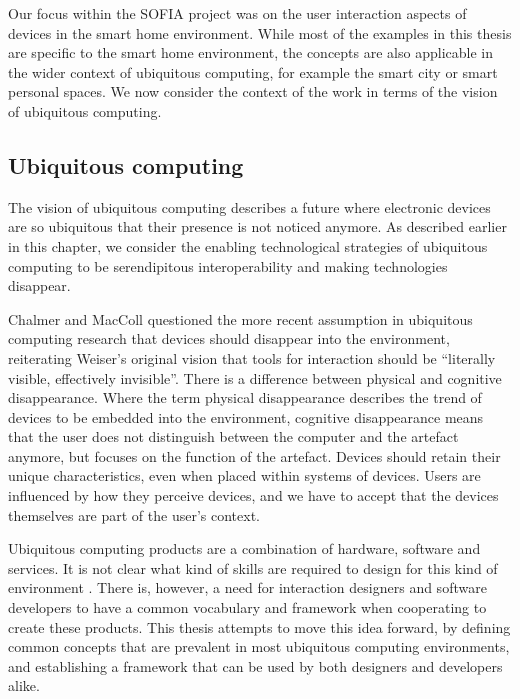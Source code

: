 Our focus within the \ac{SOFIA} project was on the user interaction aspects of devices in the smart home environment. While most of the examples in this thesis are specific to the smart home environment, the concepts are also applicable in the wider context of ubiquitous computing, for example the smart city or smart personal spaces. %
We now consider the context of the work in terms of the vision of ubiquitous computing.

\subsection{Ubiquitous computing}

The vision of ubiquitous computing describes a future where electronic devices are so ubiquitous that their presence is not noticed anymore. As described earlier in this chapter, we consider the enabling technological strategies of ubiquitous computing to be serendipitous interoperability and making technologies disappear.

Chalmer and MacColl \cite{Chalmers2003} questioned the more recent assumption in ubiquitous computing research that devices should disappear into the environment, reiterating Weiser's original vision that tools for interaction should be ``literally visible, effectively invisible''. There is a difference between physical and cognitive disappearance. Where the term physical disappearance describes the trend of devices to be embedded into the environment, cognitive disappearance means that the user does not distinguish between the computer and the artefact anymore, but focuses on the function of the artefact. Devices should retain their unique characteristics, even when placed within systems of devices. Users are influenced by how they perceive devices, and we have to accept that the devices themselves are part of the user's context.

Ubiquitous computing products are a combination of hardware, software and services. It is not clear what kind of skills are required to design for this kind of environment \cite{Kuniavsky}. There is, however, a need for interaction designers and software developers to have a common vocabulary and framework when cooperating to create these products. This thesis attempts to move this idea forward, by defining common concepts that are prevalent in most ubiquitous computing environments, and establishing a framework that can be used by both designers and developers alike.


